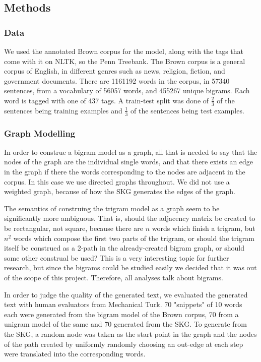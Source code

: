 \documentclass[12pt]{article}
\begin{document}
\subsection*{Methods}

\subsubsection*{Data}
We used the annotated Brown corpus for the model, along with the tags that come with it on NLTK, so the Penn Treebank. The Brown corpus is a general corpus of English, in different genres such as news, religion, fiction, and government documents. There are 1161192 words in the corpus, in 57340 sentences, from a vocabulary of 56057 words, and 455267 unique bigrams. Each word is tagged with one of 437 tags. A train-test split was done of $\frac{2}{3}$ of the sentences being training examples and $\frac{1}{3}$ of the sentences being test examples. %

\subsubsection*{Graph Modelling}

In order to construe a bigram model as a graph, all that is needed to say that the nodes of the graph are the individual single words, and that there exists an edge in the graph if there the words corresponding to the nodes are adjacent in the corpus. In this case we use directed graphs throughout. We did not use a weighted graph, because of how the SKG generates the edges of the graph. %

The semantics of construing the trigram model as a graph seem to be significantly more ambiguous. That is, should the adjacency matrix be created to be rectangular, not square, because there are $n$ words which finish a trigram, but $n^2$ words which compose the first two parts of the trigram, or should the trigram itself be construed as a 2-path in the already-created bigram graph, or should some other construal be used? This is a very interesting topic for further research, but since the bigrams could be studied easily we decided that it was out of the scope of this project. Therefore, all analyses talk about bigrams.

In order to judge the quality of the generated text, we evaluated the generated text with human evaluators from Mechanical Turk. 70 "snippets" of 10 words each were generated from the bigram model of the Brown corpus, 70 from a unigram model of the same and 70 generated from the SKG. To generate from the SKG, a random node was taken as the start point in the graph and the nodes of the path created by uniformly randomly choosing an out-edge at each step were translated into the corresponding words.
\end{document}
